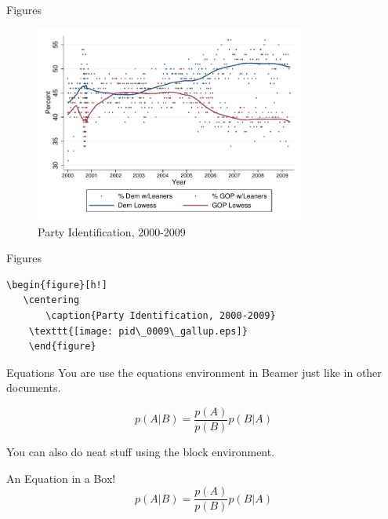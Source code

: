 \documentclass[mathserif, xcolor=svgnames]{beamer}
\begin{document}
\begin{frame}[fragile, label=figs]{Figures}

\begin{figure}[h!]
   \centering
       \caption{Party Identification, 2000-2009}
    \includegraphics[width=3.5in]{pid_0009_gallup.pdf}
    \end{figure}

\vspace{-22pt}
\hyperlink{hyper}{}
\end{frame}

\begin{frame}[fragile]{Figures}

\begin{verbatim}
\begin{figure}[h!]
   \centering
       \caption{Party Identification, 2000-2009}
    \texttt{[image: pid\_0009\_gallup.eps]}
    \end{figure}
\end{verbatim}

\end{frame}

\begin{frame}[fragile]{Equations}
You are use the equations environment in Beamer just like in other documents.

\begin{equation}
p(A|B)=\frac{p(A)}{p(B)}p(B|A)
\end{equation}
\vspace {10pt}

You can also do neat stuff using the block environment.

\begin{block}{An Equation in a Box!}
\begin{equation}
p(A|B)=\frac{p(A)}{p(B)}p(B|A)
\end{equation}
\end{block}

\end{frame}
\end{document}

